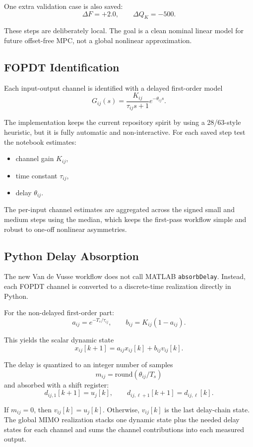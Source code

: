 One extra validation case is also saved:
\[
\Delta F = +2.0,\qquad \Delta Q_K = -500.
\]

These steps are deliberately local. The goal is a clean nominal linear model for future offset-free MPC, not a global nonlinear approximation.

\subsection{FOPDT Identification}

Each input-output channel is identified with a delayed first-order model
\[
G_{ij}(s) = \frac{K_{ij}}{\tau_{ij}s + 1} e^{-\theta_{ij}s}.
\]

The implementation keeps the current repository spirit by using a 28/63-style heuristic, but it is fully automatic and non-interactive. For each saved step test the notebook estimates:
\begin{itemize}
    \item channel gain \(K_{ij}\),
    \item time constant \(\tau_{ij}\),
    \item delay \(\theta_{ij}\).
\end{itemize}

The per-input channel estimates are aggregated across the signed small and medium steps using the median, which keeps the first-pass workflow simple and robust to one-off nonlinear asymmetries.

\subsection{Python Delay Absorption}

The new Van de Vusse workflow does not call MATLAB \texttt{absorbDelay}. Instead, each FOPDT channel is converted to a discrete-time realization directly in Python.

For the non-delayed first-order part:
\[
a_{ij} = e^{-T_s/\tau_{ij}}, \qquad
b_{ij} = K_{ij}(1-a_{ij}).
\]

This yields the scalar dynamic state
\[
x_{ij}[k+1] = a_{ij} x_{ij}[k] + b_{ij} v_{ij}[k].
\]

The delay is quantized to an integer number of samples
\[
m_{ij} = \mathrm{round}(\theta_{ij}/T_s)
\]
and absorbed with a shift register:
\[
d_{ij,1}[k+1] = u_j[k], \qquad
d_{ij,\ell+1}[k+1] = d_{ij,\ell}[k].
\]

If \(m_{ij}=0\), then \(v_{ij}[k]=u_j[k]\). Otherwise, \(v_{ij}[k]\) is the last delay-chain state. The global MIMO realization stacks one dynamic state plus the needed delay states for each channel and sums the channel contributions into each measured output.

